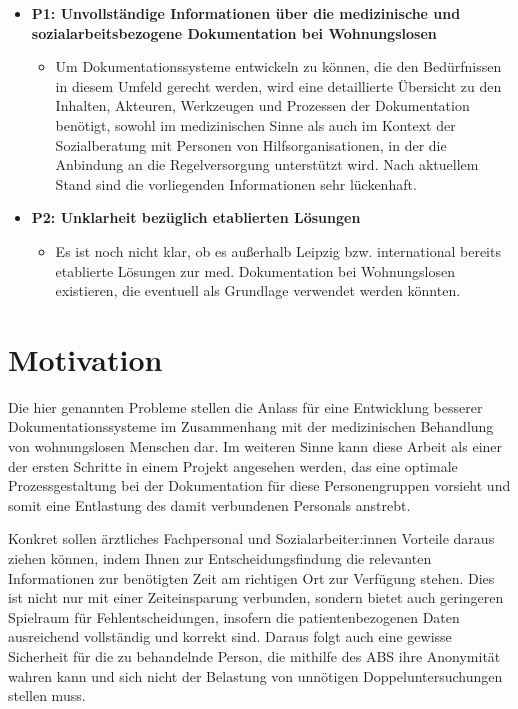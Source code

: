 \begin{itemize}
\item \textbf{P1: Unvollständige Informationen über die medizinische und sozialarbeitsbezogene Dokumentation bei Wohnungslosen}
	\begin{itemize}
		\item[] Um Dokumentationssysteme entwickeln zu können, die den Bedürfnissen in diesem Umfeld gerecht werden, wird eine detaillierte Übersicht zu den Inhalten, Akteuren, Werkzeugen und Prozessen der Dokumentation benötigt, sowohl im medizinischen Sinne als auch im Kontext der Sozialberatung mit Personen von Hilfsorganisationen, in der die Anbindung an die Regelversorgung unterstützt wird. Nach aktuellem Stand sind die vorliegenden Informationen sehr lückenhaft.
	\end{itemize}
\item \textbf{P2: Unklarheit bezüglich etablierten Lösungen}
	\begin{itemize}
		\item[] Es ist noch nicht klar, ob es außerhalb Leipzig bzw. international bereits etablierte Lösungen zur med. Dokumentation bei Wohnungslosen existieren, die eventuell als Grundlage verwendet werden könnten.
	\end{itemize}
\end{itemize}


\section{Motivation}

Die hier genannten Probleme stellen die Anlass für eine Entwicklung besserer Dokumentationssysteme im Zusammenhang mit der medizinischen Behandlung von wohnungslosen Menschen dar. Im weiteren Sinne kann diese Arbeit als einer der ersten Schritte in einem Projekt angesehen werden, das eine optimale Prozessgestaltung bei der Dokumentation für diese Personengruppen vorsieht und somit eine Entlastung des damit verbundenen Personals anstrebt.

Konkret sollen ärztliches Fachpersonal und Sozialarbeiter:innen Vorteile daraus ziehen können, indem Ihnen zur Entscheidungsfindung die relevanten Informationen zur benötigten Zeit am richtigen Ort zur Verfügung stehen. Dies ist nicht nur mit einer Zeiteinsparung verbunden, sondern bietet auch geringeren Spielraum für Fehlentscheidungen, insofern die patientenbezogenen Daten ausreichend vollständig und korrekt sind. Daraus folgt auch eine gewisse Sicherheit für die zu behandelnde Person, die mithilfe des ABS ihre Anonymität wahren kann und sich nicht der Belastung von unnötigen Doppeluntersuchungen stellen muss.

